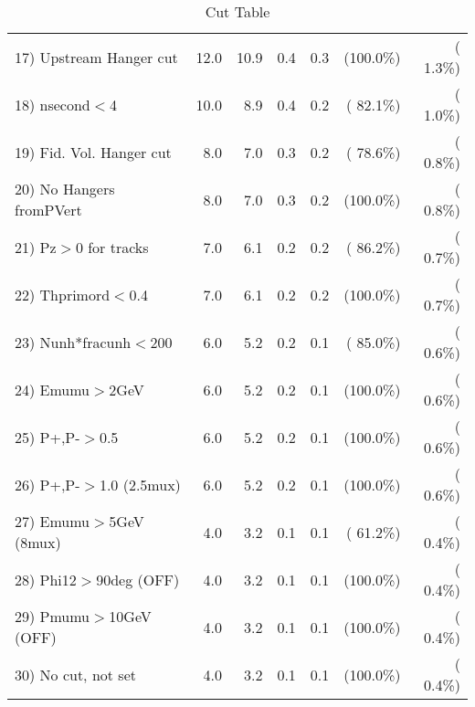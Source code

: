 \begin{table}[h!]
\begin{tabular}{||l||r|r|r|r|r|r||}
 17) Upstream Hanger cut  &         12.0 &         10.9 &          0.4 &          0.3 & (100.0\%) & (  1.3\%) \\
 18) nsecond$<$4          &         10.0 &          8.9 &          0.4 &          0.2 & ( 82.1\%) & (  1.0\%) \\
 19) Fid. Vol. Hanger cut &          8.0 &          7.0 &          0.3 &          0.2 & ( 78.6\%) & (  0.8\%) \\
 20) No Hangers fromPVert &          8.0 &          7.0 &          0.3 &          0.2 & (100.0\%) & (  0.8\%) \\
 21) Pz$>$0 for tracks    &          7.0 &          6.1 &          0.2 &          0.2 & ( 86.2\%) & (  0.7\%) \\
 22) Thprimord$<$0.4      &          7.0 &          6.1 &          0.2 &          0.2 & (100.0\%) & (  0.7\%) \\
 23) Nunh*fracunh$<$200   &          6.0 &          5.2 &          0.2 &          0.1 & ( 85.0\%) & (  0.6\%) \\
 24) Emumu$>$2GeV         &          6.0 &          5.2 &          0.2 &          0.1 & (100.0\%) & (  0.6\%) \\
 25) P+,P-$>$0.5          &          6.0 &          5.2 &          0.2 &          0.1 & (100.0\%) & (  0.6\%) \\
 26) P+,P-$>$1.0 (2.5mux) &          6.0 &          5.2 &          0.2 &          0.1 & (100.0\%) & (  0.6\%) \\
 27) Emumu$>$5GeV  (8mux) &          4.0 &          3.2 &          0.1 &          0.1 & ( 61.2\%) & (  0.4\%) \\
 28) Phi12$>$90deg  (OFF) &          4.0 &          3.2 &          0.1 &          0.1 & (100.0\%) & (  0.4\%) \\
 29) Pmumu$>$10GeV  (OFF) &          4.0 &          3.2 &          0.1 &          0.1 & (100.0\%) & (  0.4\%) \\
 30) No cut, not set      &          4.0 &          3.2 &          0.1 &          0.1 & (100.0\%) & (  0.4\%) \\
 \hline
 \hline
 \end{tabular}
 \caption{Cut Table           }
 \label{tab-cutcohjpsi-mumu_cohrho0}
 \end{table}
